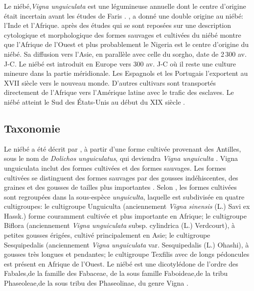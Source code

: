 \documentclass[a4paper,11pt]{article}
\begin{document}
Le niébé,\emph{Vigna unguiculata} est une légumineuse annuelle dont le
centre d'origine était incertain avant les études de Faris
\cite{FARIS_1963,FARIS_1965}. \citeauthor{Piper_1913}
\citeyear{Piper_1913}, a donné une double origine au niébé: l'Inde et
l'Afrique.\cite{FARIS_1963,FARIS_1965} après des études qui se sont
reposées sur une description cytologique et morphologique des formes
sauvages et cultivées du niébé montre que l'Afrique de l'Ouest et plus
probablement le Nigeria est le centre d'origine du niébé. Sa diffusion
vers l'Asie, en parallèle avec celle du sorgho, date de 2\,300
av. J-C. Le niébé est introduit en Europe vers 300 av. J-C où il reste
une culture mineure dans la partie méridionale. Les Espagnols et les
Portugais l'exportent au XVII\ieme{} siècle vers le nouveau
monde. D'autres cultivars sont transportés directement de l'Afrique
vers l'Amérique latine avec le trafic des esclaves. Le niébé atteint
le Sud des États-Unis au début du XIX\ieme{} siècle
\cite{Sawadogo_2009}.

\subsection{Taxonomie}

Le niébé a été décrit par , à partir
d'une forme cultivée provenant des Antilles, sous le nom de
\emph{Dolichos unguiculatus}, qui deviendra \emph{Vigna unguiculta}
\cite{Pasquet_1997}. Vigna unguiculata inclut des formes cultivées et
des formes sauvages. Les formes cultivées se distinguent des formes
sauvages par des gousses indéhiscentes, des graines et des gousses de
tailles plus importantes \cite{Lush_1981}.  Selon
\citeauthor{Vanderborght_2001} \citeyear{Vanderborght_2001}, les
formes cultivées sont regroupées dans la sous-espèce
\emph{unguiculta}, laquelle est subdivisée en quatre cultigroupes: le
cultigroupe Unguiculta (anciennement \emph{ Vigna sinensis} (L.) Savi
ex Hassk.)  forme couramment cultivée et plus importante en Afrique;
le cultigroupe Biflora (anciennement \emph{Vigna unguiculata}
subsp. cylindrica (L.) Verdcourt), à petites gousses érigées, cultivé
principalement en Asie; le cultigroupe Sesquipedalis (anciennement
\emph{Vigna unguiculata} var. Sesquipedalis (L.) Ohashi), à gousses
très longues et pendantes; le cultigroupe Texfilis avec de longs
pédoncules est présent en Afrique de l'Ouest. Le niébé est une
dicotylédone de l'ordre des Fabales,de la famille des Fabaceae, de la
sous famille Faboideae,de la tribu Phaseoleae,de la sous tribu des
Phaseolinae, du genre Vigna \cite{Verdcourt_1970, Marechal_1978}.
\end{document}
